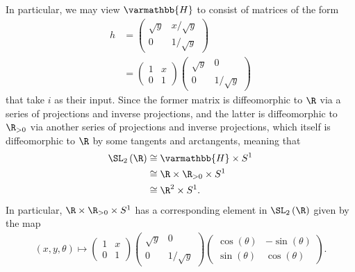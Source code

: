 \documentclass[10pt]{mypackage}
\renewcommand*{\mathbb}[1]{\varmathbb{#1}}
\begin{document}
\begin{solution}
  In particular, we may view $ \mathbb{H} $ to consist of matrices of the form
  \begin{align*}
    h &= \begin{pmatrix}\sqrt{y} & x/\sqrt{y} \\ 0 & 1/\sqrt{y}\end{pmatrix}\\
      &= \begin{pmatrix}1 & x \\ 0 & 1\end{pmatrix} \begin{pmatrix}\sqrt{y} & 0 \\ 0 & 1/\sqrt{y}\end{pmatrix}
  \end{align*}
  that take $i$ as their input. Since the former matrix is diffeomorphic to $\R$ via a series of projections and inverse projections, and the latter is diffeomorphic to $\R_{> 0}$ via another series of projections and inverse projections, which itself is diffeomorphic to $\R$ by some tangents and arctangents, meaning that
  \begin{align*}
    \SL_2\left( \R \right) &\cong \mathbb{H}\times S^{1}\\
                           &\cong \R\times \R_{> 0}\times S^{1}\\
                           &\cong \R^2\times S^{1}.
  \end{align*}
  In particular, $\R\times \R_{ > 0 }\times S^{1}$ has a corresponding element in $\SL_2\left( \R \right)$ given by the map 
  \begin{align*}
    \left( x,y,\theta \right) \mapsto \begin{pmatrix}1 & x \\ 0 & 1\end{pmatrix} \begin{pmatrix}\sqrt{y} & 0 \\ 0 & 1/\sqrt{y}\end{pmatrix} \begin{pmatrix}\cos\left( \theta \right) & -\sin\left( \theta \right)\\ \sin\left( \theta \right) & \cos\left( \theta \right)\end{pmatrix}.
  \end{align*}
\end{solution}
\end{document}
